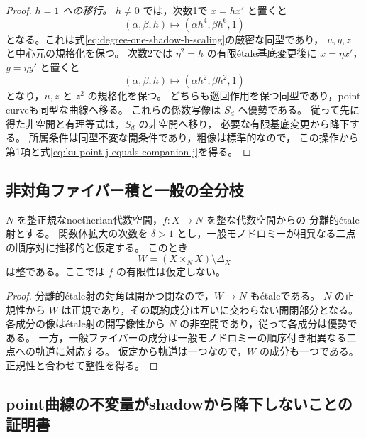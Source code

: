 \begin{proof}
\emph{$h=1$ への移行。}
$h\ne0$ では，次数1で $x=hx'$ と置くと
\[
 (\alpha,\beta,h)\longmapsto(\alpha h^4,\beta h^6,1)
\]
となる。これは式\eqref{eq:degree-one-shadow-h-scaling}の厳密な同型であり，
$u,y,z$ と中心元の規格化を保つ。
次数2では $\eta^2=h$ の有限\'{e}tale基底変更後に
$x=\eta x'$，$y=\eta y'$ と置くと
\[
 (\alpha,\beta,h)\longmapsto(\alpha h^2,\beta h^2,1)
\]
となり，$u,z$ と $z^2$ の規格化を保つ。
どちらも巡回作用を保つ同型であり，point curveも同型な曲線へ移る。
これらの係数写像は $S_d$ へ優勢である。
従って先に得た非空開と有理等式は，$S_d$ の非空開へ移り，
必要な有限基底変更から降下する。
所属条件は同型不変な開条件であり，粗像は標準的なので，
この操作から第1項と式\eqref{eq:ku-point-j-equals-companion-j}を得る。
\end{proof}

\subsection{非対角ファイバー積と一般の全分枝}

\begin{lemma}[全非対角部分の整性]
\label{lem:ku-global-offdiagonal-integral}
$N$ を整正規なnoetherian代数空間，$f:X\to N$ を整な代数空間からの
分離的\'{e}tale射とする。
関数体拡大の次数を $\delta>1$ とし，一般モノドロミーが相異なる二点の順序対に推移的と仮定する。
このとき
\[
 W=(X\times_NX)\setminus\Delta_X
\]
は整である。ここでは $f$ の有限性は仮定しない。
\end{lemma}
\begin{proof}
分離的\'{e}tale射の対角は開かつ閉なので，$W\to N$ も\'{e}taleである。
$N$ の正規性から $W$ は正規であり，その既約成分は互いに交わらない開閉部分となる。
各成分の像は\'{e}tale射の開写像性から $N$ の非空開であり，従って各成分は優勢である。
一方，一般ファイバーの成分は一般モノドロミーの順序付き相異なる二点への軌道に対応する。
仮定から軌道は一つなので，$W$ の成分も一つである。
正規性と合わせて整性を得る。
\end{proof}

\subsection{point曲線の不変量がshadowから降下しないことの証明書}

